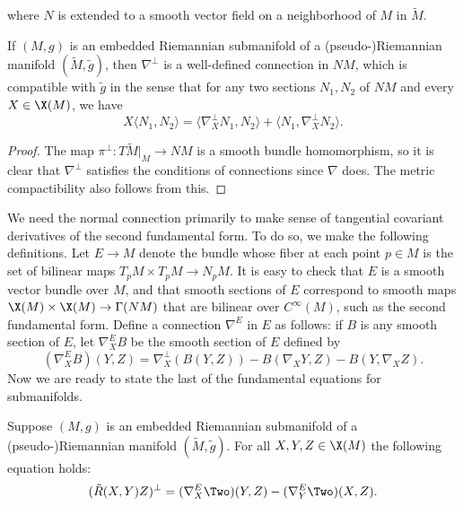 where $N$ is extended to a smooth vector field on a neighborhood of $M$ in $\widetilde{M}$.
\begin{proposition}
If $(M,g)$ is an embedded Riemannian submanifold of a (pseudo-)Riemannian manifold $(\widetilde{M},\tilde{g})$, then $\nabla^{\bot}$ is a well-defined 
connection in $NM$, which is compatible with $\tilde{g}$ in the sense that for any two sections $N_1,N_2$ of $NM$ and every $X\in\X(M)$, we have
\[X\langle N_1,N_2\rangle=\langle\nabla^{\bot}_XN_1,N_2\rangle+\langle N_1,\nabla^{\bot}_XN_2\rangle.\]
\end{proposition}
\begin{proof}
The map $\pi^{\bot}:T\widetilde{M}|_M\to NM$ is a smooth bundle homomorphism, so it is clear that $\nabla^{\bot}$ satisfies the conditions of connections since $\nabla$ does. 
The metric compactibility also follows from this.
\end{proof}
We need the normal connection primarily to make sense of tangential covariant derivatives of the second fundamental form. To do so, we make the following definitions. 
Let $E\to M$ denote the bundle whose fiber at each point $p\in M$ is the set of bilinear maps $T_pM\times T_pM\to N_pM$. It is easy to check that $E$ is a smooth vector 
bundle over $M$, and that smooth sections of $E$ correspond to smooth maps $\X(M)\times\X(M)\to\Gamma(NM)$ that are bilinear over $C^\infty(M)$, such as the second 
fundamental form. Define a connection $\nabla^E$ in $E$ as follows: if $B$ is any smooth section of $E$, let $\nabla^E_XB$ be the smooth section of $E$ defined by
\[(\nabla^E_XB)(Y,Z)=\nabla_X^{\bot}(B(Y,Z))-B(\nabla_XY,Z)-B(Y,\nabla_XZ).\]
Now we are ready to state the last of the fundamental equations for submanifolds.
\begin{theorem}
Suppose $(M,g)$ is an embedded Riemannian submanifold of a (pseudo-)Riemannian manifold $(\widetilde{M},\tilde{g})$. For all $X,Y,Z\in\X(M)$ the following 
equation holds:
\begin{align}\label{Riemann Codazzi equation-1}
(\tilde{R}(X,Y)Z)^{\bot}=(\nabla^E_X\Two)(Y,Z)-(\nabla^E_Y\Two)(X,Z).
\end{align}
\end{theorem}
